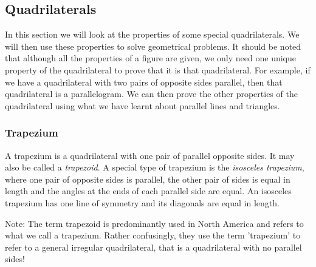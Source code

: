     
    
    \label{m39354*uid52}
            \subsection{ Quadrilaterals}
            \nopagebreak
            
        
        \label{m39354*id974}In this section we will look at the properties of some special quadrilaterals. We will then use these properties to solve geometrical problems. It should be noted that although all the properties of a figure are given, we only need one unique property of the quadrilateral to prove that it is that quadrilateral. For example, if we have a quadrilateral with two pairs of opposite sides parallel, then that quadrilateral is a parallelogram. We can then prove the other properties of the quadrilateral using what we have learnt about parallel lines and triangles.\par 
        \label{m39354*uid54}
            \subsubsection{ Trapezium}
            \nopagebreak
            
          
          \label{m39354*id318803}A trapezium is a quadrilateral with one pair of parallel opposite sides. It may also be called a \textsl{trapezoid}. A special type of trapezium is the \textsl{isosceles trapezium}, where one pair of opposite sides is parallel, the other pair of sides is equal in length and the angles at the ends of each parallel side are equal. An isosceles trapezium has one line of symmetry and its diagonals are equal in length.\par 
          \label{m39354*eip-994}Note: The term trapezoid is predominantly used in North America and refers to what we call a trapezium. Rather confusingly, they use the term 'trapezium' to refer to a general irregular quadrilateral, that is a quadrilateral with no parallel sides!\par 
    \setcounter{subfigure}{0}


